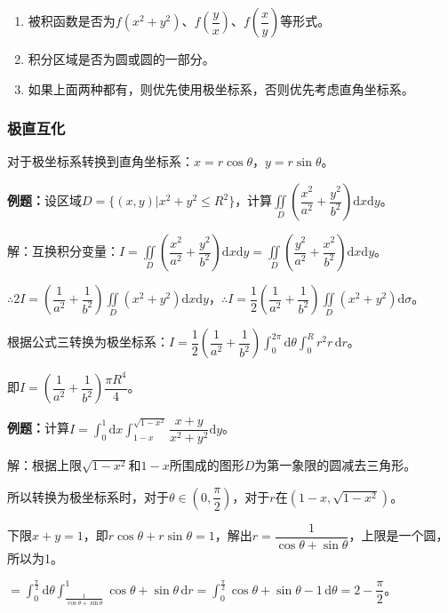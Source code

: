 \begin{enumerate}
    \item 被积函数是否为$f(x^2+y^2)$、$f\left(\dfrac{y}{x}\right)$、$f\left(\dfrac{x}{y}\right)$等形式。
    \item 积分区域是否为圆或圆的一部分。
    \item 如果上面两种都有，则优先使用极坐标系，否则优先考虑直角坐标系。
\end{enumerate}

\subsubsection{极直互化}

对于极坐标系转换到直角坐标系：$x=r\cos\theta$，$y=r\sin\theta$。

\textbf{例题：}设区域$D=\{(x,y)|x^2+y^2\leqslant R^2\}$，计算$\displaystyle{\iint\limits_D\left(\dfrac{x^2}{a^2}+\dfrac{y^2}{b^2}\right)\textrm{d}x\textrm{d}y}$。

解：互换积分变量：$I=\displaystyle{\iint\limits_D\left(\dfrac{x^2}{a^2}+\dfrac{y^2}{b^2}\right)\textrm{d}x\textrm{d}y}=\displaystyle{\iint\limits_D\left(\dfrac{y^2}{a^2}+\dfrac{x^2}{b^2}\right)\textrm{d}x\textrm{d}y}$。

$\therefore2I=\left(\dfrac{1}{a^2}+\dfrac{1}{b^2}\right)\displaystyle{\iint\limits_D(x^2+y^2)\textrm{d}x\textrm{d}y}$，$\therefore I=\dfrac{1}{2}\left(\dfrac{1}{a^2}+\dfrac{1}{b^2}\right)\displaystyle{\iint\limits_D(x^2+y^2)\textrm{d}\sigma}$。

根据公式三转换为极坐标系：$I=\dfrac{1}{2}\left(\dfrac{1}{a^2}+\dfrac{1}{b^2}\right)\int_0^{2\pi}\textrm{d}\theta\int_0^Rr^2r\,\textrm{d}r$。

即$I=\left(\dfrac{1}{a^2}+\dfrac{1}{b^2}\right)\dfrac{\pi R^4}{4}$。

\textbf{例题：}计算$I=\int_0^1\textrm{d}x\int_{1-x}^{\sqrt{1-x^2}}\dfrac{x+y}{x^2+y^2}\textrm{d}y$。

解：根据上限$\sqrt{1-x^2}$和$1-x$所围成的图形$D$为第一象限的圆减去三角形。

所以转换为极坐标系时，对于$\theta\in\left(0,\dfrac{\pi}{2}\right)$，对于$r$在$(1-x,\sqrt{1-x^2})$。

下限$x+y=1$，即$r\cos\theta+r\sin\theta=1$，解出$r=\dfrac{1}{\cos\theta+\sin\theta}$，上限是一个圆，所以为1。

$=\int_0^\frac{\pi}{2}\textrm{d}\theta\int_\frac{1}{\cos\theta+\sin\theta}^1\cos\theta+\sin\theta\,\textrm{d}r=\int_0^\frac{\pi}{2}\cos\theta+\sin\theta-1\,\textrm{d}\theta=2-\dfrac{\pi}{2}$。

